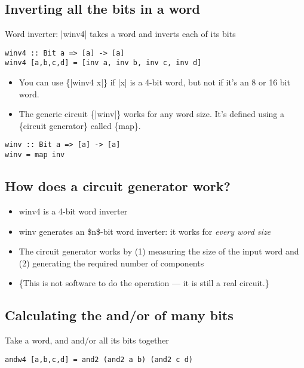 \documentclass[11pt]{article}
\begin{document}
\subsection{Inverting all the bits in a word}
\label{sec:org112b49c}

Word inverter: |winv4| takes a word and inverts each of its bits

\begin{verbatim}
winv4 :: Bit a => [a] -> [a]
winv4 [a,b,c,d] = [inv a, inv b, inv c, inv d]
\end{verbatim}

\begin{itemize}
\item You can use \{\color{blue}|winv4 x|\} if |x| is a 4-bit word, but
not if it's an 8 or 16 bit word.
\item The generic circuit \{\color{blue}|winv|\} works for any word
size.  It's defined using a \{\color{red}circuit generator\} called
\{\color{red}map\}.
\end{itemize}

\begin{verbatim}
winv :: Bit a => [a] -> [a]
winv = map inv
\end{verbatim}

\subsection{How does a circuit generator work?}
\label{sec:org9df353c}

\begin{itemize}
\item winv4 is a 4-bit word inverter
\item winv generates an \$n\$-bit word inverter: it works for
\emph{every word size}
\item The circuit generator works by (1) measuring the size of the
input word and (2) generating the required number of components
\item \{\color{red}This is not software to do the operation --- it is
still a real circuit.\}
\end{itemize}

\subsection{Calculating the and/or of many bits}
\label{sec:org01019f2}

Take a word, and and/or all its bits together

\begin{verbatim}
andw4 [a,b,c,d] = and2 (and2 a b) (and2 c d)
\end{verbatim}
\end{document}
